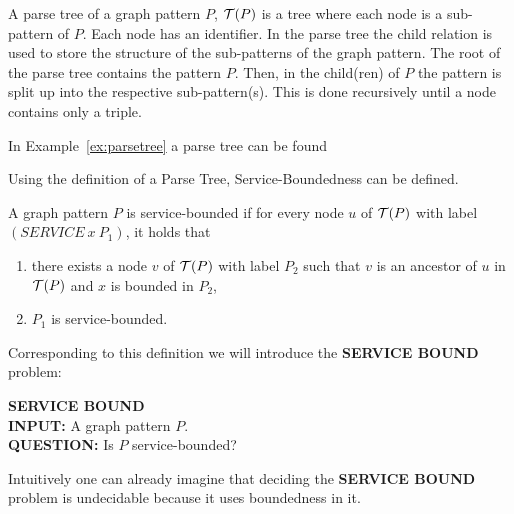 \begin{definition}
	A parse tree of a graph pattern $P$, $\mathcal{T}(P)$ is a tree where each
	node is a sub-pattern of $P$. Each node has an identifier.
	In the parse tree the child relation is used to store the structure of the
	sub-patterns of the graph pattern. The root of the parse tree contains the pattern $P$. Then, 
	in the child(ren) of $P$ the pattern is split up into the respective sub-pattern(s). This is done recursively 	until a node contains only a triple. 


\end{definition}
In Example~\ref{ex:parsetree} a parse tree can be found

Using the definition of a Parse Tree, Service-Boundedness can be defined.

\begin{definition}
	A graph pattern $P$ is service-bounded if for every node $u$ of $\mathcal{T}(P)$ with
	label $(SERVICE \ x\  P_1)$, it holds that
	\begin{enumerate}
		\item there exists a node $v$ of $\mathcal{T}(P)$ with label $P_2$ such that $v$
			is an ancestor of $u$ in $\mathcal{T}(P)$ and $x$ is bounded in $P_2$,
		\item $P_1$ is service-bounded.
	\end{enumerate}
\end{definition}

Corresponding to this definition we will introduce the \textbf{SERVICE BOUND}
problem:
\begin{framed}\noindent \textbf{SERVICE BOUND}\\
	\textbf{INPUT:} A graph pattern $P$.\\
	\textbf{QUESTION:} Is $P$ service-bounded?
\end{framed}

Intuitively one can already imagine that deciding the \textbf{SERVICE BOUND}
problem is undecidable because it uses boundedness in it.

